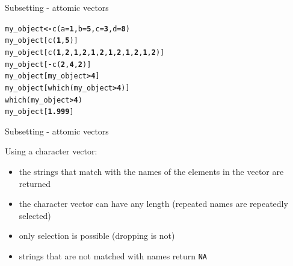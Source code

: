 \documentclass{beamer}\usepackage[]{graphicx}\usepackage[]{color}
\makeatletter
\newcommand{\hlnum}[1]{\textcolor[rgb]{0.502,0,0.502}{\textbf{#1}}}%
\newcommand{\hlopt}[1]{\textcolor[rgb]{1,0,0.502}{\textbf{#1}}}%
\newcommand{\hlstd}[1]{\textcolor[rgb]{0,0,0}{#1}}%
\newcommand{\hlkwb}[1]{\textcolor[rgb]{0.502,0.502,0.753}{\textbf{#1}}}%
\newcommand{\hlkwc}[1]{\textcolor[rgb]{0,0.502,0.753}{#1}}%
\newcommand{\hlkwd}[1]{\textcolor[rgb]{0,0.267,0.4}{#1}}%
\newenvironment{kframe}{%
 \def\at@end@of@kframe{}%
 \ifinner\ifhmode%
  \def\at@end@of@kframe{\end{minipage}}%
  \begin{minipage}{\columnwidth}%
 \fi\fi%
 \def\FrameCommand##1{\hskip\@totalleftmargin \hskip-\fboxsep
 \colorbox{shadecolor}{##1}\hskip-\fboxsep
     \hskip-\linewidth \hskip-\@totalleftmargin \hskip\columnwidth}%
 \MakeFramed {\advance\hsize-\width
   \@totalleftmargin\z@ \linewidth\hsize
   \@setminipage}}%
 {\par\unskip\endMakeFramed%
 \at@end@of@kframe}
\newenvironment{knitrout}{}{} %
\makeatother
\begin{document}
\begin{frame}[fragile]{Subsetting - attomic vectors}
\begin{knitrout}
\color{fgcolor}\begin{kframe}
\begin{alltt}
\hlstd{my_object} \hlkwb{<-} \hlkwd{c}\hlstd{(}\hlkwc{a} \hlstd{=} \hlnum{1}\hlstd{,} \hlkwc{b} \hlstd{=} \hlnum{5}\hlstd{,} \hlkwc{c} \hlstd{=} \hlnum{3}\hlstd{,} \hlkwc{d} \hlstd{=} \hlnum{8}\hlstd{)}
\hlstd{my_object[}\hlkwd{c}\hlstd{(}\hlnum{1}\hlstd{,} \hlnum{5}\hlstd{)]}
\hlstd{my_object[}\hlkwd{c}\hlstd{(}\hlnum{1}\hlstd{,} \hlnum{2}\hlstd{,} \hlnum{1}\hlstd{,} \hlnum{2}\hlstd{,} \hlnum{1}\hlstd{,} \hlnum{2}\hlstd{,} \hlnum{1} \hlstd{,}\hlnum{2}\hlstd{,} \hlnum{1}\hlstd{,} \hlnum{2}\hlstd{,} \hlnum{1}\hlstd{,} \hlnum{2}\hlstd{)]}
\hlstd{my_object[}\hlopt{-}\hlkwd{c}\hlstd{(}\hlnum{2}\hlstd{,} \hlnum{4}\hlstd{,} \hlnum{2}\hlstd{)]}
\hlstd{my_object[my_object} \hlopt{>} \hlnum{4}\hlstd{]}
\hlstd{my_object[}\hlkwd{which}\hlstd{(my_object} \hlopt{>} \hlnum{4}\hlstd{)]}
\hlkwd{which}\hlstd{(my_object} \hlopt{>} \hlnum{4}\hlstd{)}
\hlstd{my_object[}\hlnum{1.999}\hlstd{]}
\end{alltt}
\end{kframe}
\end{knitrout}

\end{frame}



\begin{frame}{Subsetting - attomic vectors}

Using a character vector:

\begin{itemize}
  \item the strings that match with the names of the elements in the vector are returned
  \item the character vector can have any length (repeated names are repeatedly selected)
  \item only selection is possible (dropping is not)
  \item strings that are not matched with names return \texttt{NA}
\end{itemize}

\end{frame}
\end{document}
